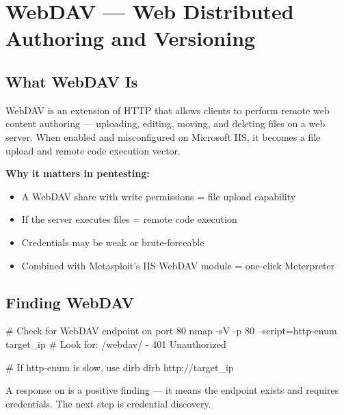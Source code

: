 
\section{WebDAV --- Web Distributed Authoring and Versioning}
\label{sec:webdav}

\subsection{What WebDAV Is}

WebDAV is an extension of HTTP that allows clients to perform remote web content
authoring --- uploading, editing, moving, and deleting files on a web server.
When enabled and misconfigured on Microsoft IIS, it becomes a file upload and
remote code execution vector.

\textbf{Why it matters in pentesting:}
\begin{itemize}
  \item A WebDAV share with write permissions = file upload capability
  \item If the server executes  files = remote code execution
  \item Credentials may be weak or brute-forceable
  \item Combined with Metasploit's IIS WebDAV module = one-click Meterpreter
\end{itemize}

\subsection{Finding WebDAV}

\begin{termbox}
# Check for WebDAV endpoint on port 80
nmap -sV -p 80 --script=http-enum target_ip
# Look for: /webdav/ - 401 Unauthorized

# If http-enum is slow, use dirb
dirb http://target_ip
\end{termbox}

\begin{notebox}
A  response on  is a positive finding ---
it means the endpoint exists and requires credentials. The next step is
credential discovery.
\end{notebox}

